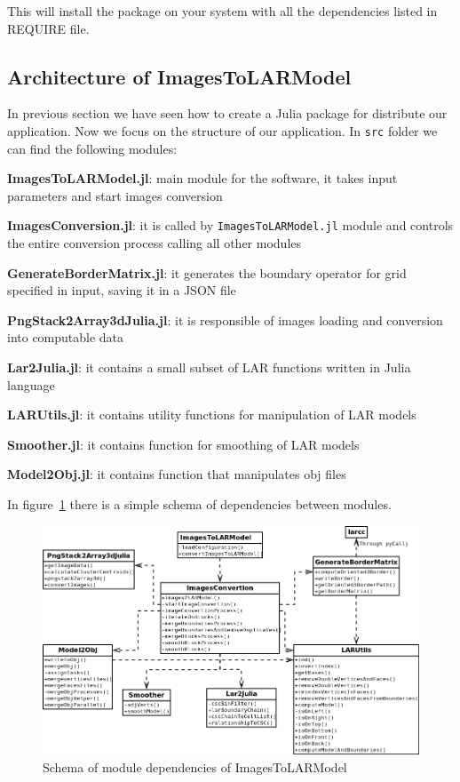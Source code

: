 \documentclass[11pt,oneside]{article}	%
\begin{document}
This will install the package on your system with all the dependencies listed in REQUIRE file. 

\subsection{Architecture of ImagesToLARModel}\label{sec:architecture}

In previous section we have seen how to create a Julia package for distribute our application. Now we focus on the structure of our application. In \texttt{src} folder we can find the following modules:

\begin{description}
 \item \textbf{ImagesToLARModel.jl}: main module for the software, it takes input parameters and start images conversion
 \item \textbf{ImagesConversion.jl}: it is called by \texttt{ImagesToLARModel.jl} module and controls the entire conversion process calling all other modules
 \item \textbf{GenerateBorderMatrix.jl}: it generates the boundary operator for grid specified in input, saving it in a JSON file
 \item \textbf{PngStack2Array3dJulia.jl}: it is responsible of images loading and conversion into computable data
 \item \textbf{Lar2Julia.jl}: it contains a small subset of LAR functions written in Julia language
 \item \textbf{LARUtils.jl}: it contains utility functions for manipulation of LAR models
 \item \textbf{Smoother.jl}: it contains function for smoothing of LAR models
 \item \textbf{Model2Obj.jl}: it contains function that manipulates obj files
\end{description}

In figure~\ref{fig:architecture} there is a simple schema of dependencies between modules.

\begin{figure}[htb]
  \begin{center}
    \includegraphics[width=16cm]{images/architecture.png}
  \end{center}
  \caption{Schema of module dependencies of ImagesToLARModel}
  \label{fig:architecture}
\end{figure}
\end{document}
